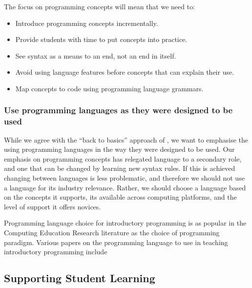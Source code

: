 The focus on programming concepts will mean that we need to:
\begin{itemize}
	\item Introduce programming concepts incrementally.
	\item Provide students with time to put concepts into practice.
	\item See syntax as a means to an end, not an end in itself.
	\item Avoid using language features before concepts that can explain their use.
	\item Map concepts to code using programming language grammars.
\end{itemize} 


\subsubsection{Use programming languages as they were designed to be used} %
\label{ssub:use_programming_languages_as_they_were_designed_to_be_used}

While we agree with the ``back to basics'' approach of \citet{Reges:2006}, we want to emphasise the using programming languages in the way they were designed to be used. Our emphasis on programming concepts has relegated language to a secondary role, and one that can be changed by learning new syntax rules. If this is achieved changing between languages is less problematic, and therefore we should not use a language for its industry relevance. Rather, we should choose a language based on the concepts it supports, its available across computing platforms, and the level of support it offers novices.

Programming language choice for introductory programming is as popular in the Computing Education Research literature as the choice of programming paradigm. Various papers on the programming language to use in teaching introductory programming include \cite{Anik:2011,Boszormenyi:1998,Bishop:2006,Brilliant:1996,Howell:2003,Kelleher:2005,Koffman:1988,Maloney:2010,Mannila:2006,Mannila:2006a,Mody:1991,Pendergast:2006,Roberts:1993}




\subsection{Supporting Student Learning} %
\label{sub:supporting_student_learning}

